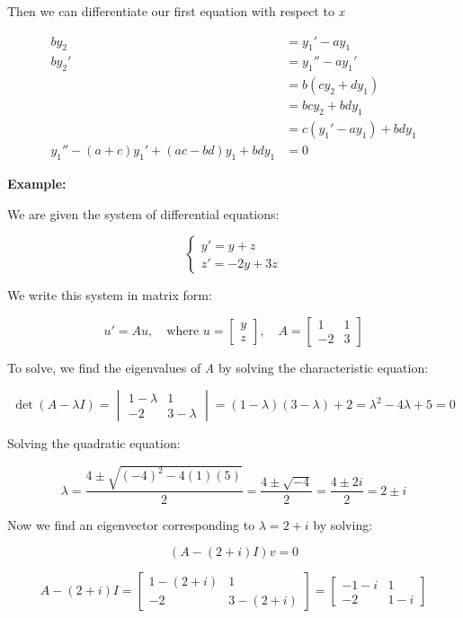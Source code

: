 Then we can differentiate our first equation with respect to \emph{x}


\begin{align*}
    by_2 &= y_1' - ay_1\\
    by_2' &= y_1'' - ay_1'\\
    &= b (cy_2 + dy_1)\\
    &= bcy_2 + bdy_1\\
    &= c (y_1' -ay_1 ) + bdy_1\\
    y_1'' - (a + c)y_1' + (ac - bd)y_1 + bdy_1 &= 0
\end{align*}



\textbf{Example:}
\vspace{\baselineskip}

We are given the system of differential equations:

\[
    \begin{cases}
    y' = y + z \\
    z' = -2y + 3z
    \end{cases}
\]

We write this system in matrix form:

\[
    u' = Au, \quad \text{where } u = \begin{bmatrix} y \\ z \end{bmatrix}, \quad A = \begin{bmatrix} 1 & 
        1 \\ -2 & 3 \end{bmatrix}
\]

To solve, we find the eigenvalues of \emph{A} by solving the characteristic equation:

\[
    \det(A - \lambda I) = 
    \begin{vmatrix}
    1 - \lambda & 1 \\
    -2 & 3 - \lambda
    \end{vmatrix}
    = (1 - \lambda)(3 - \lambda) + 2 = \lambda^2 - 4\lambda + 5 = 0
\]

Solving the quadratic equation:

\[
    \lambda = \frac{4 \pm \sqrt{(-4)^2 - 4(1)(5)}}{2} = \frac{4 \pm \sqrt{-4}}{2} = \frac{4 \pm 2i}{2} 
    = 2 \pm i
\]

Now we find an eigenvector corresponding to \( \lambda = 2 + i \) by solving:

\[
(A - (2 + i)I)v = 0
\]

\[
    A - (2 + i)I = \begin{bmatrix} 1 - (2 + i) & 1 \\ -2 & 3 - (2 + i) \end{bmatrix}
    = \begin{bmatrix} -1 - i & 1 \\ -2 & 1 - i \end{bmatrix}
\]

